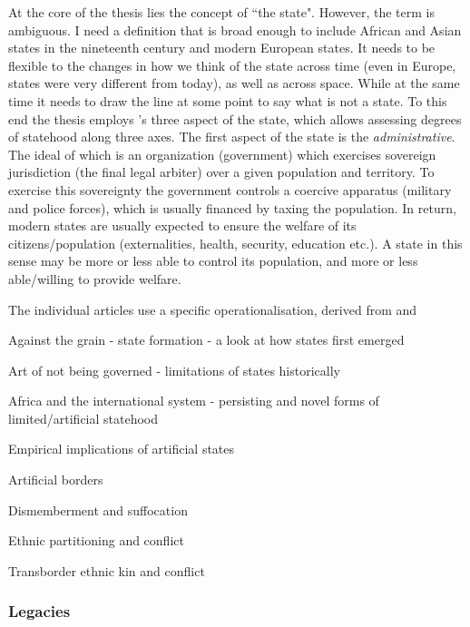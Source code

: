 \documentclass[12pt]{article}
\begin{document}
At the core of the thesis lies the concept of ``the state". However, the term is
ambiguous. I need a definition that is broad enough to include African and Asian
states in the nineteenth century and modern European states. It needs to be
flexible to the changes in how we think of the state across time (even in
Europe, states were very different from today), as well as across space. While
at the same time it needs to draw the line at some point to say what is not a
state. To this end the thesis employs \citet{Clapham1996}'s three aspect of the
state, which allows assessing degrees of statehood along three axes. The first
aspect of the state is the \textit{administrative}. The ideal of which is an
organization (government) which exercises sovereign jurisdiction (the final
legal arbiter) over a given population and territory. To exercise this
sovereignty the government controls a coercive apparatus (military and police
forces), which is usually financed by taxing the population. In return, modern
states are usually expected to ensure the welfare of its citizens/population
(externalities, health, security, education etc.). A state in this sense may be
more or less able to control its population, and more or less able/willing to
provide welfare.

The individual articles use a specific operationalisation, derived
from \citet{Butcher2019} and \citet{Butcher2017}

\citet{scott2017against} Against the grain - state formation - a look at how
states first emerged

\citet{Scott2009} Art of not being governed - limitations of states historically

\citet{Clapham1996} Africa and the international system - persisting and novel
forms of limited/artificial statehood

Empirical implications of artificial states

\citet{Alesina2011} Artificial borders

\citet{Englebert2002} Dismemberment and suffocation

\citet{Ito2020} Ethnic partitioning and conflict

\citet{Cederman2013, Salehyan2009, Weidmann2015} Transborder ethnic kin and
conflict


\subsubsection{Legacies} \label{Legacies} 

\end{document}
